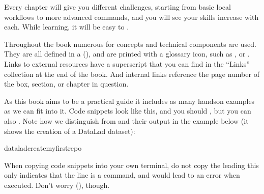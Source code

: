 \sphinxAtStartPar
Every chapter will give you different challenges, starting from basic local
workflows to more advanced commands, and you will see your skills increase
with each. While learning, it will be easy to
.

\sphinxAtStartPar
Throughout the book numerous  for concepts and technical components
are used. They are all defined in a {\hyperref[\detokenize{glossary:glossary}]{}} (), and are printed
with a glossary icon, such as {\hyperref[\detokenize{glossary:term-Git}]{}}, or {\hyperref[\detokenize{glossary:term-commit-message}]{}}.
Links to external resources have a superscript that you can find in the “Links” collection at the end of the book.
And internal links reference the page number of the box, section, or chapter in question.

\sphinxAtStartPar
As this book aims to be a practical guide it includes as many hands\sphinxhyphen{}on examples
as we can fit into it. Code snippets look like this, and you should
, but you can also
.
Note how we distinguish  from  and their output
in the example below (it shows the creation of a DataLad dataset):

\begin{sphinxVerbatim}[commandchars=\\\{\}]
dataladcreatemyfirstrepo
\end{sphinxVerbatim}

\sphinxAtStartPar
When copying code snippets into your own terminal, do not copy the leading
\sphinxcode{\sphinxupquote{\$}} \textendash{} this only indicates that the line is a command, and would lead to an
error when executed.
Don’t worry {\hyperref[\detokenize{intro/narrative:fom-lazy}]{}} (), though.

